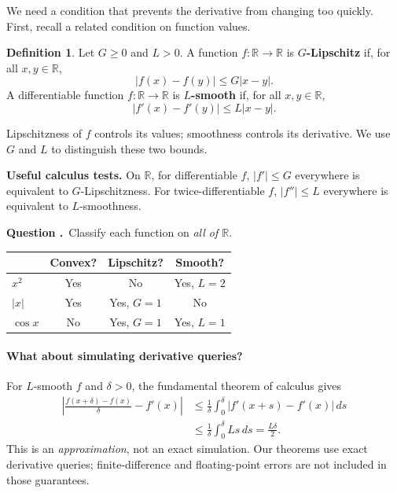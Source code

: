 \documentclass[11pt,letterpaper]{article}
\newif\ifstudentversion
\newcommand{\hide}[1]{%
  \ifstudentversion
    \ifmmode\phantom{#1}\else\underline{\phantom{#1}}\fi
  \else #1\fi}
\theoremstyle{definition}
\newtheorem{definition}{Definition}
\theoremstyle{plain}
\newcounter{question}
\newenvironment{Qu}{%
  \par\medskip\refstepcounter{question}
  \noindent\textbf{Question \thequestion.}\ }{\par\medskip}
\newcommand{\QU}{\begin{Qu}}
\newcommand{\R}{\mathbb R}
\begin{document}
We need a condition that prevents the derivative from changing too quickly.
First, recall a related condition on function values.

\begin{definition}
Let $G\geq0$ and $L>0$. A function $f:\R\to\R$ is
\textbf{$G$-Lipschitz} if, for all $x,y\in\R$,
\[
  |f(x)-f(y)|\leq G|x-y|.
\]
A differentiable function $f:\R\to\R$ is \textbf{$L$-smooth} if, for all
$x,y\in\R$,
\[
  \boxed{|f'(x)-f'(y)|\leq L|x-y|.}
\]
\end{definition}

Lipschitzness of $f$ controls its \hide{values}; smoothness controls its
\hide{derivative}. We use $G$ and $L$ to distinguish these two bounds.

\textbf{Useful calculus tests.} On $\R$, for differentiable $f$,
$|f'|\leq G$ everywhere is equivalent to $G$-Lipschitzness.
For twice-differentiable $f$, $|f''|\leq L$ everywhere is equivalent to
$L$-smoothness.

\QU Classify each function on \emph{all of $\R$}.
\begin{center}
\renewcommand{\arraystretch}{1.35}
\begin{tabular}{lccc}
 & \textbf{Convex?} & \textbf{Lipschitz?} & \textbf{Smooth?}\\\hline
$x^2$ & \hide{Yes} & \hide{No} & \hide{Yes, $L=2$}\\
$|x|$ & \hide{Yes} & \hide{Yes, $G=1$} & \hide{No}\\
$\cos x$ & \hide{No} & \hide{Yes, $G=1$} & \hide{Yes, $L=1$}
\end{tabular}
\end{center}
\end{Qu}

\paragraph{What about simulating derivative queries?}
For $L$-smooth $f$ and $\delta>0$, the fundamental theorem of calculus gives
\begin{align*}
 \left|\frac{f(x+\delta)-f(x)}{\delta}-f'(x)\right|
 &\leq\frac{1}{\delta}\int_0^\delta|f'(x+s)-f'(x)|\,ds\\
 &\leq\frac{1}{\delta}\int_0^\delta Ls\,ds
 =\frac{L\delta}{2}.
\end{align*}
This is an \emph{approximation}, not an exact simulation. Our theorems use
exact derivative queries; finite-difference and floating-point errors are
not included in those guarantees.
\end{document}
